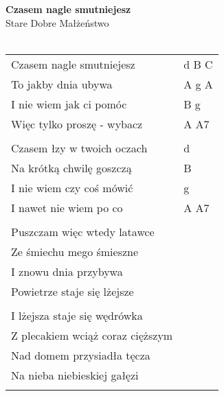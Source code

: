 \documentclass[a5paper]{article}
\begin{document}


\noindent
\fontsize{12pt}{15pt}\selectfont
\textbf{Czasem nagle smutniejesz} \\
\fontsize{8pt}{10pt}\selectfont
Stare Dobre Małżeństwo \\ \\
\fontsize{10pt}{12pt}\selectfont
{}
\begin{tabular}{@{}p{8.00cm}p{3cm}@{}}
\noindent
Czasem nagle smutniejesz & d B C \\
To jakby dnia ubywa & A g A \\
I nie wiem jak ci pomóc & B g \\
Więc tylko proszę - wybacz & A A7 \\ \\

Czasem łzy w twoich oczach & d \\
Na krótką chwilę goszczą & B \\
I nie wiem czy coś mówić & g \\
I nawet nie wiem po co & A A7 \\ \\

Puszczam więc wtedy latawce \\
Ze śmiechu mego śmieszne \\
I znowu dnia przybywa \\
Powietrze staje się lżejsze \\ \\

I lżejsza staje się wędrówka \\
Z plecakiem wciąż coraz cięższym \\
Nad domem przysiadła tęcza \\
Na nieba niebieskiej gałęzi \\ \\
\end{tabular}
\end{document}
